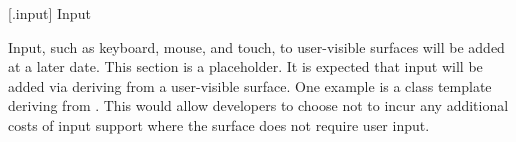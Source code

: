 
 [\iotwod.input] {Input}

\pnum
\begin{note}
Input, such as keyboard, mouse, and touch, to user-visible surfaces will be added at a later date. This section is a placeholder. It is expected that input will be added via deriving from a user-visible surface. One example is a  class template deriving from . This would allow developers to choose not to incur any additional costs of input support where the surface does not require user input.
\end{note}
